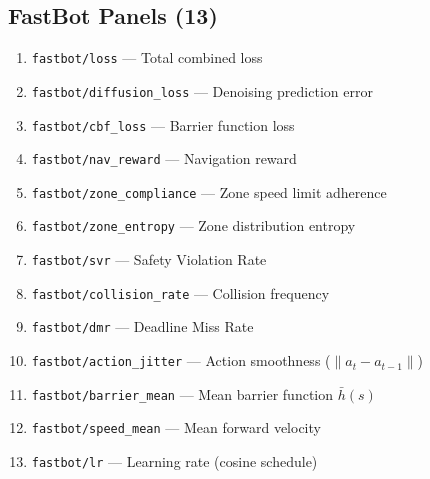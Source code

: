 \documentclass[conference]{IEEEtran}
\begin{document}
\subsection{FastBot Panels (13)}
\begin{enumerate}
    \item \texttt{fastbot/loss} — Total combined loss
    \item \texttt{fastbot/diffusion\_loss} — Denoising prediction error
    \item \texttt{fastbot/cbf\_loss} — Barrier function loss
    \item \texttt{fastbot/nav\_reward} — Navigation reward
    \item \texttt{fastbot/zone\_compliance} — Zone speed limit adherence
    \item \texttt{fastbot/zone\_entropy} — Zone distribution entropy
    \item \texttt{fastbot/svr} — Safety Violation Rate
    \item \texttt{fastbot/collision\_rate} — Collision frequency
    \item \texttt{fastbot/dmr} — Deadline Miss Rate
    \item \texttt{fastbot/action\_jitter} — Action smoothness ($\|a_t - a_{t-1}\|$)
    \item \texttt{fastbot/barrier\_mean} — Mean barrier function $\bar{h}(s)$
    \item \texttt{fastbot/speed\_mean} — Mean forward velocity
    \item \texttt{fastbot/lr} — Learning rate (cosine schedule)
\end{enumerate}
\end{document}
